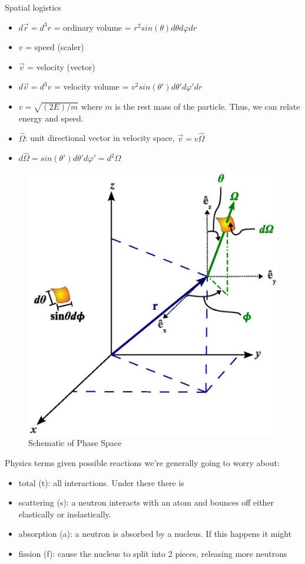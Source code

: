 \documentclass[12pt]{article}
\newcommand{\vOmega}{\ensuremath{\hat{\Omega}}}
\begin{document}
Spatial logistics
\begin{itemize}
\item $d\vec{r} = d^3r$ = ordinary volume = $r^2 sin(\theta) d\theta d\varphi dr$
%
\item $v$ = speed (scaler)
\item $\vec{v}$ = velocity (vector)
\item $d\vec{v} = d^3v$ = velocity volume = $v^2 sin(\theta')d\theta' d\varphi' dr$
\item $v = \sqrt{(2E)/m}$ where $m$ is the rest mass of the particle. Thus, we can relate energy and speed.

\item $\vOmega$: unit directional vector in velocity space, $\vec{v} = v\vOmega$
\item $d\vOmega = sin(\theta')d\theta' d\varphi' =  d^2\Omega$
\end{itemize}

\begin{figure}
    \begin{center}
    \includegraphics[keepaspectratio, width = 2.7 in]{phase_space}
    \end{center}
    \caption{Schematic of Phase Space}
    \label{fig:phase_space}
\end{figure}


Physics terms given possible reactions we're generally going to worry about:
\begin{itemize}
\item total (t): all interactions. Under there there is 
\item scattering (s): a neutron interacts with an atom and bounces off either elastically or inelastically.
\item absorption (a): a neutron is absorbed by a nucleus. If this happens it might
\item fission (f): cause the nucleus to split into 2 pieces, releasing more neutrons
\end{itemize}
\end{document}

